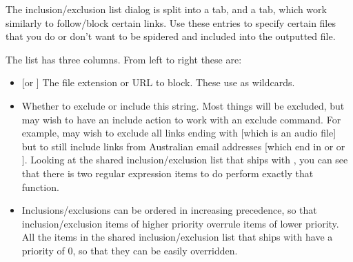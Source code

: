 

The inclusion/exclusion list dialog is split into a  tab, and a  tab, which work
similarly to follow/block certain links. Use these entries to specify certain 
files that you do or don't want to be spidered and included into the
outputted file.

The list has three columns. From left to right these are:

\begin{itemize}
  \item {} [or ] The file 
  extension or URL to block. These use
  \helpignore{\ref{sec:pd-exclusion-dialog-regular-expressions}}
  as wildcards.

  \item {} Whether to exclude or include this string. Most 
  things will be excluded, but may wish to have an include action to work with 
  an exclude command. For example, may wish to exclude all links ending with
   [which is an audio file] but to still include links from
  Australian email addresses [which end in  or  or
  ]. Looking at the shared inclusion/exclusion list that ships with 
  \brandingapplicationdesktopname, you can see that there is two regular expression 
  items to do perform exactly that function.

  \item {} Inclusions/exclusions can be ordered in increasing 
  precedence, so that inclusion/exclusion items of higher priority overrule items of 
  lower priority. All the items in the shared inclusion/exclusion list that ships 
  with \brandingapplicationdesktopname have a priority of 0, so that they can be easily 
  overridden.
\end{itemize}

